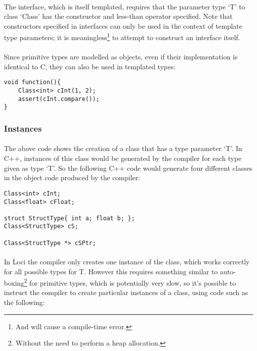 \documentclass[12pt,twoside,notitlepage]{report}
\begin{document}
\paragraph{}
The interface, which is itself templated, requires that the parameter type `T' to class `Class' has the constructor and less-than operator specified. Note that constructors specified in interfaces can only be used in the context of template type parameters; it is meaningless\footnote{And will cause a compile-time error.} to attempt to construct an interface itself.

\paragraph{}
Since primitive types are modelled as objects, even if their implementation is identical to C, they can also be used in templated types:

\small{
\begin{verbatim}
void function(){
    Class<int> cInt(1, 2);
    assert(cInt.compare());
}
\end{verbatim}
}

\subsubsection{Instances}

\paragraph{}
The above code shows the creation of a class that has a type parameter `T'. In C++, instances of this class would be generated by the compiler for each type given as type `T'. So the following C++ code would generate four different classes in the object code produced by the compiler:

\small{
\begin{verbatim}
Class<int> cInt;
Class<float> cFloat;

struct StructType{ int a; float b; };
Class<StructType> cS;

Class<StructType *> cSPtr;
\end{verbatim}
}

\paragraph{}
In Loci the compiler only creates one instance of the class, which works correctly for all possible types for T. However this requires something similar to auto-boxing\footnote{Without the need to perform a heap allocation.} for primitive types, which is potentially very slow, so it's possible to instruct the compiler to create particular instances of a class, using code such as the following:
\end{document}
